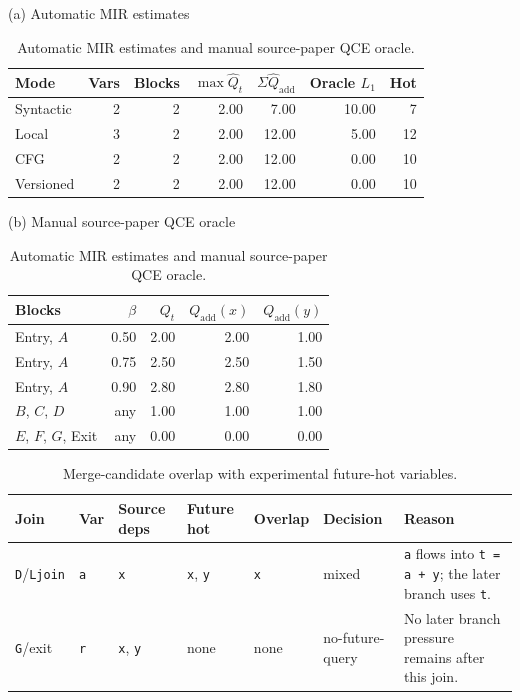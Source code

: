 \documentclass[conference]{IEEEtran}
\newcommand{\tighttable}{\scriptsize\renewcommand{\arraystretch}{1.16}}
\begin{document}
\begin{table}[H]
\caption{Automatic MIR estimates and manual source-paper QCE oracle.}
\label{tab:qce-comparison}
\centering
\begin{minipage}[t]{0.58\textwidth}
\centering
{\footnotesize (a) Automatic MIR estimates}
\vspace{1pt}

\centering
\tighttable
\setlength{\tabcolsep}{2.5pt}
\begin{tabular}{@{}lrrrrrr@{}}
\toprule
Mode & Vars & Blocks & \(\max\widehat{Q}_t\) & \(\Sigma\widehat{Q}_{\mathrm{add}}\) & Oracle \(L_1\) & Hot \\
\midrule
Syntactic & 2 & 2 & 2.00 & 7.00 & 10.00 & 7 \\
Local & 3 & 2 & 2.00 & 12.00 & 5.00 & 12 \\
CFG & 2 & 2 & 2.00 & 12.00 & 0.00 & 10 \\
Versioned & 2 & 2 & 2.00 & 12.00 & 0.00 & 10 \\
\bottomrule
\end{tabular}
\end{minipage}
\hfill
\begin{minipage}[t]{0.38\textwidth}
\centering
{\footnotesize (b) Manual source-paper QCE oracle}
\vspace{1pt}

\centering
\tighttable
\setlength{\tabcolsep}{2.5pt}
\begin{tabular}{@{}lrrrr@{}}
\toprule
Blocks & \(\beta\) & \(Q_t\) & \(Q_{\mathrm{add}}(x)\) & \(Q_{\mathrm{add}}(y)\) \\
\midrule
Entry, \(A\) & 0.50 & 2.00 & 2.00 & 1.00 \\
Entry, \(A\) & 0.75 & 2.50 & 2.50 & 1.50 \\
Entry, \(A\) & 0.90 & 2.80 & 2.80 & 1.80 \\
\(B\), \(C\), \(D\) & any & 1.00 & 1.00 & 1.00 \\
\(E\), \(F\), \(G\), Exit & any & 0.00 & 0.00 & 0.00 \\
\bottomrule
\end{tabular}
\end{minipage}
\end{table}

\begin{table}[H]
\caption{Merge-candidate overlap with experimental future-hot variables.}
\label{tab:state-merge-decision}
\centering
\tighttable
\begin{tabularx}{\textwidth}{@{}llllllY@{}}
\toprule
Join & Var & Source deps & Future hot & Overlap & Decision & Reason \\
\midrule
\texttt{D}/\texttt{Ljoin}
& \texttt{a} & \texttt{x} & \texttt{x}, \texttt{y} & \texttt{x}
& mixed
& \texttt{a} flows into \texttt{t = a + y}; the later branch uses \texttt{t}. \\
\texttt{G}/exit
& \texttt{r} & \texttt{x}, \texttt{y} & none & none
& no-future-query
& No later branch pressure remains after this join. \\
\bottomrule
\end{tabularx}
\end{table}
\end{document}
